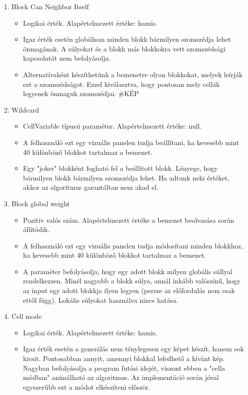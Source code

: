 \begin{enumerate}
    \item Block Can Neighbor Itself
    \begin{itemize}
        \item Logikai érték. Alapértelmezett értéke: hamis.
        \item Igaz érték esetén globálisan minden blokk bármilyen szomszédja lehet önmagának. A súlyokat és a blokk más blokkokra vett szomszédsági kapcsolatát nem befolyásolja.
        \item Alternatívaként készíthetünk a bemenetre olyan blokkokat, melyek leírják ezt a szomszédságot. Ezzel kiválasztva, hogy pontosan mely cellák legyenek önmaguk szomszédjai. \#KÉP
    \end{itemize}
    \item Wildcard
    \begin{itemize}
        \item CellVariable típusú paraméter. Alapértelmezett értéke: null.
        \item A felhasználó ezt egy vizuális panelen tudja beállítani, ha kevesebb mint 40 különböző blokkot tartalmaz a bemenet.
        \item Egy "joker" blokként fogható fel a beállított blokk. Lényege, hogy bármilyen blokk bármilyen szomszédja lehet. Ha adtunk neki értéket, akkor az algoritmus garantáltan nem akad el.
    \end{itemize}
    \item Block global weight
    \begin{itemize}
        \item Pozitív valós szám. Alapértelmezett értéke a bemenet beolvasása során állítódik.
        \item A felhasználó ezt egy vizuális panelen tudja módosítani minden blokkhoz, ha kevesebb mint 40 különböző blokkot tartalmaz a bemenet.
        \item A paraméter befolyásolja, hogy egy adott blokk milyen globális súllyal rendelkezzen. Minél nagyobb a blokk súlya, annál inkább valószínű, hogy az input egy adott blokkja ilyen legyen (persze az előfordulás nem csak ettől függ). Lokális súlyokat használva nincs hatása.
    \end{itemize}
    \item Cell mode
    \begin{itemize}
        \item Logikai érték. Alapértelmezett értéke: hamis.
        \item Igaz érték esetén a generálás nem ténylegesen egy képet készít, hanem sok kicsit. Pontosabban annyit, amennyi blokkal lefedhető a kívánt kép. Nagyban befolyásolja a program futási idejét, viszont ebben a "cella módban" animálható az algoritmus. Az implementáció során jóval egyszerűbb ezt a módot elkészíteni először.

\end{itemize}
\end{enumerate}
